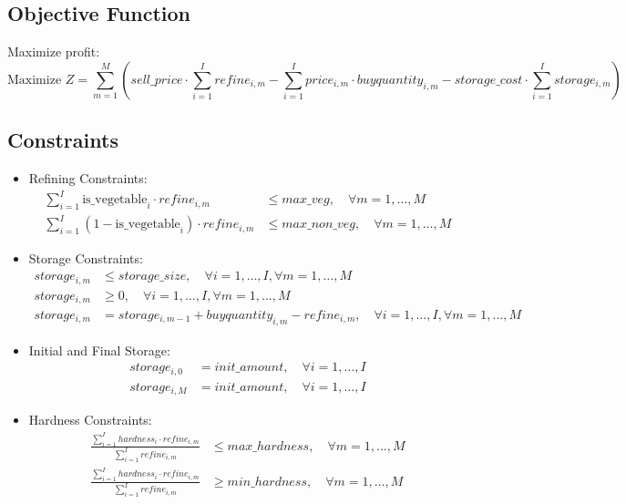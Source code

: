 \documentclass{article}
\begin{document}
\subsection*{Objective Function}
Maximize profit:
\[
\text{Maximize } Z = \sum_{m=1}^{M} \left( sell\_price \cdot \sum_{i=1}^{I} refine_{i,m} - \sum_{i=1}^{I} price_{i,m} \cdot buyquantity_{i,m} - storage\_cost \cdot \sum_{i=1}^{I} storage_{i,m} \right)
\]

\subsection*{Constraints}

\begin{itemize}
    \item Refining Constraints:
    \begin{align*}
        \sum_{i=1}^{I} \text{is\_vegetable}_i \cdot refine_{i,m} & \leq max\_veg, \quad \forall m = 1,\ldots,M \\
        \sum_{i=1}^{I} (1 - \text{is\_vegetable}_i) \cdot refine_{i,m} & \leq max\_non\_veg, \quad \forall m = 1,\ldots,M
    \end{align*}

    \item Storage Constraints:
    \begin{align*}
        storage_{i,m} & \leq storage\_size, \quad \forall i = 1,\ldots,I, \forall m = 1,\ldots,M \\
        storage_{i,m} & \geq 0, \quad \forall i = 1,\ldots,I, \forall m = 1,\ldots,M \\
        storage_{i,m} & = storage_{i,m-1} + buyquantity_{i,m} - refine_{i,m}, \quad \forall i = 1,\ldots,I, \forall m = 1,\ldots,M
    \end{align*}
    
    \item Initial and Final Storage:
    \begin{align*}
        storage_{i,0} & = init\_amount, \quad \forall i = 1,\ldots,I \\
        storage_{i,M} & = init\_amount, \quad \forall i = 1,\ldots,I
    \end{align*}

    \item Hardness Constraints:
    \begin{align*}
        \frac{\sum_{i=1}^{I} hardness_i \cdot refine_{i,m}}{\sum_{i=1}^{I} refine_{i,m}} & \leq max\_hardness, \quad \forall m = 1,\ldots,M \\
        \frac{\sum_{i=1}^{I} hardness_i \cdot refine_{i,m}}{\sum_{i=1}^{I} refine_{i,m}} & \geq min\_hardness, \quad \forall m = 1,\ldots,M
    \end{align*}
\end{itemize}
\end{document}
